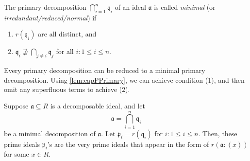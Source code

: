 \begin{definition}
    The primary decomposition \( \bigcap_{i=1}^n \mathfrak{q}_i \) of an ideal \( \mathfrak{a} \) is called \emph{minimal} (or\emph{ irredundant/reduced/normal}) if
    \begin{enumerate}
        \item \( r(\mathfrak{q}_i) \) are all distinct, and 
        \item \( \mathfrak{q}_i \not\supseteq \bigcap_{j \neq i} \mathfrak{q}_j \) for all \( i: 1 \le i \le n \). 
    \end{enumerate}
\end{definition}
\begin{remark}
  Every primary decomposition can be reduced to a minimal primary decomposition. Using \autoref{lem:capPPrimary}, we can achieve condition (\( 1 \)), and then omit any superfluous terms to achieve (\( 2 \)).
\end{remark}
\begin{theorem}
    Suppose \( \mathfrak{a} \subseteq R \) is a decomposable ideal, and let 
    \[
    \mathfrak{a} = \bigcap_{i = 1}^n \mathfrak{q}_i
    \]
    be a minimal decomposition of \( \mathfrak{a} \). Let \( \mathfrak{p}_i = r(\mathfrak{q}_i) \) for \(i: 1 \le i \le n \). Then, these prime ideals  \( \mathfrak{p}_i \)'s are the very prime ideals that appear in the form of \( r(\mathfrak{a}: (x)) \) for some \( x \in R \).
\end{theorem}
